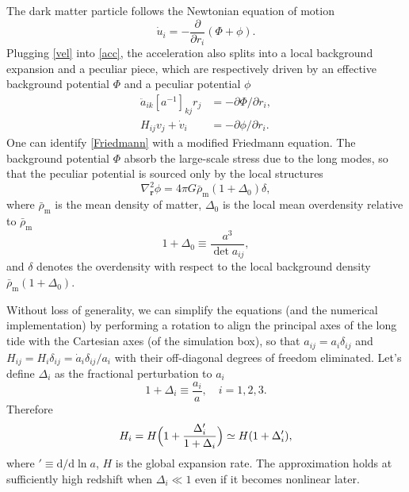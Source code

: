 \documentclass[a4paper,11pt]{article}
\renewcommand{\d}{\mathrm{d}}
\newcommand{\vr}{{\bm r}}
\newcommand{\rhobarm}{{\bar\rho_\mathrm{m}}}
\begin{document}
The dark matter particle follows the Newtonian equation of motion
\begin{equation}
    \dot u_i = - \frac{\partial}{\partial r_i} (\Phi + \phi).
    \label{acc}
\end{equation}
Plugging \eqref{vel} into \eqref{acc}, the acceleration also splits into
a local background expansion and a peculiar piece,
which are respectively driven by an effective background potential $\Phi$ and
a peculiar potential $\phi$
\begin{align}
    \ddot a_{ik} [a^{-1}]_{kj} r_j &= - \partial\Phi / \partial r_i,
    \label{Friedmann} \\
    H_{ij} v_j + \dot v_i &= - \partial\phi / \partial r_i.
    \label{pecvel}
\end{align}
One can identify \eqref{Friedmann} with a modified Friedmann equation.
The background potential $\Phi$ absorb the large-scale stress due to the long
modes, so that the peculiar potential is sourced only by the local structures
\begin{equation}
    \nabla_\vr^2 \phi = 4\pi G \rhobarm (1 + \Delta_0) \delta,
    \label{poisson}
\end{equation}
where $\rhobarm$ is the mean density of matter, $\Delta_0$ is the
local mean overdensity relative to $\rhobarm$
\begin{equation}
    1 + \Delta_0 \equiv \frac{a^3}{\det a_{ij}},
\end{equation}
and $\delta$ denotes the overdensity with respect to the local background
density $\rhobarm (1 + \Delta_0)$.

Without loss of generality, we can simplify the equations (and the numerical
implementation) by performing a rotation to align the principal axes of the
long tide with the Cartesian axes (of the simulation box), so that $a_{ij} =
a_i \delta_{ij}$ and $H_{ij} = H_i \delta_{ij} = \dot a_i \delta_{ij} / a_i$
with their off-diagonal degrees of freedom eliminated.
Let's define $\Delta_i$ as the fractional perturbation to $a_i$
\begin{equation}
    1 + \Delta_i \equiv \frac{a_i} a, \quad i = 1, 2, 3.
\end{equation}
Therefore
\begin{equation}
    H_i = H \Bigl( 1 + \frac{\Delta_i'}{1 + \Delta_i} \Bigr)
    \simeq H ( 1 + \Delta_i' ),
    \label{Hi}
\end{equation}
where $' \equiv \d/\d\ln a$, $H$ is the global expansion rate.
The approximation holds at sufficiently high redshift when $\Delta_i \ll 1$
even if it becomes nonlinear later.
\end{document}
